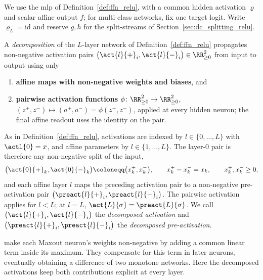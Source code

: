 We use the \ac{mlp} of Definition~\ref{def:ffn_relu}, with a common hidden activation $\varrho$ and scalar affine output $f$; for multi-class networks, fix one target logit. Write $\varrho_L=\mathrm{id}$ and reserve $g,h$ for the split-streams of Section~\ref{sec:dc_splitting_relu}.

\begin{definition}[Decomposition]\label{def:decomposition}
A \emph{decomposition} of the $L$-layer network of Definition~\ref{def:ffn_relu} propagates non-negative activation pairs $\bigl(\act{l}{+}_i, \act{l}{-}_i\bigr) \in \RR^2_{\ge 0}$ from input to output using only
\begin{enumerate}
	\item \textbf{affine maps with non-negative weights and biases}, and
	\item \textbf{pairwise activation functions} $\phi \colon \RR^2_{\ge 0} \to \RR^2_{\ge 0}$, $(z^+, z^-) \mapsto (a^+, a^-) = \phi(z^+, z^-)$, applied at every hidden neuron; the final affine readout uses the identity on the pair.
\end{enumerate}
As in Definition~\ref{def:ffn_relu}, activations are indexed by $l \in \{0,\dots,L\}$ with $\actl{0}=x$, and affine parameters by $l \in \{1,\dots,L\}$. The layer-$0$ pair is therefore any non-negative split of the input,
\begin{equation}
	\bigl(\act{0}{+}_k, \act{0}{-}_k\bigr) \coloneqq \bigl(x_k^+, x_k^-\bigr),
	\qquad
	x_k^+ - x_k^- = x_k,
	\qquad
	x_k^+, x_k^- \ge 0,
	\label{eq:input_split_convention}
\end{equation}
and each affine layer $l$ maps the preceding activation pair to a non-negative pre-activation pair $\bigl(\preact{l}{+}_i, \preact{l}{-}_i\bigr)$. The pairwise activation applies for $l<L$; at $l=L$, $\act{L}{\sigma}=\preact{L}{\sigma}$. We call $\bigl(\act{l}{+}_i,\act{l}{-}_i\bigr)$ the \emph{decomposed activation} and $\bigl(\preact{l}{+}_i,\preact{l}{-}_i\bigr)$ the \emph{decomposed pre-activation}.
\end{definition}

\textcite[Proposition~4.2]{hertrich2025neuralnetworksvirtualextended} make each Maxout neuron's weights non-negative by adding a common linear term inside its maximum. They compensate for this term in later neurons, eventually obtaining a difference of two monotone networks. Here the decomposed activations keep both contributions explicit at every layer.

